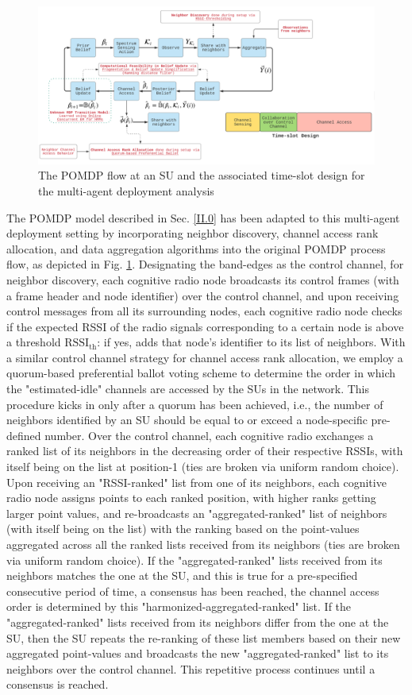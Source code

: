 \documentclass[12pt, draftcls, onecolumn]{IEEEtran}
\begin{document}
\begin{figure} [htb]
    \centerline{
    \includegraphics[width = 0.8\linewidth]{figures/Minerva_Multiagent_POMDP_Model.png}}
    \caption{The POMDP flow at an SU and the associated time-slot design for the multi-agent deployment analysis}
    \label{fig: Z. 1}
\end{figure}
The POMDP model described in Sec. \ref{II.0} has been adapted to this multi-agent deployment setting by incorporating neighbor discovery, channel access rank allocation, and data aggregation algorithms into the original POMDP process flow, as depicted in Fig. \ref{fig: Z. 1}. Designating the band-edges as the control channel, for neighbor discovery, each cognitive radio node broadcasts its control frames (with a frame header and node identifier) over the control channel, and upon receiving control messages from all its surrounding nodes, each cognitive radio node checks if the expected RSSI of the radio signals corresponding to a certain node is above a threshold $\text{RSSI}_\text{th}$: if yes, adds that node’s identifier to its list of neighbors. With a similar control channel strategy for channel access rank allocation, we employ a quorum-based preferential ballot voting scheme to determine the order in which the "estimated-idle" channels are accessed by the SUs in the network. This procedure kicks in only after a quorum has been achieved, i.e., the number of neighbors identified by an SU should be equal to or exceed a node-specific pre-defined number. Over the control channel, each cognitive radio exchanges a ranked list of its neighbors in the decreasing order of their respective  RSSIs, with itself being on the list at position-1 (ties are broken via uniform random choice). Upon receiving an "RSSI-ranked" list from one of its neighbors, each cognitive radio node assigns points to each ranked position, with higher ranks getting larger point values, and re-broadcasts an "aggregated-ranked" list of neighbors (with itself being on the list) with the ranking based on the point-values aggregated across all the ranked lists received from its neighbors (ties are broken via uniform random choice). If the "aggregated-ranked" lists received from its neighbors matches the one at the SU, and this is true for a pre-specified consecutive period of time, a consensus has been reached, the channel access order is determined by this "harmonized-aggregated-ranked" list. If the "aggregated-ranked" lists received from its neighbors differ from the one at the SU, then  the SU repeats the re-ranking of these list members based on their new aggregated point-values and broadcasts the new "aggregated-ranked" list to its neighbors over the control channel. This repetitive process continues until a consensus is reached.
\end{document}
